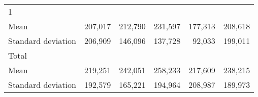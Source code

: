 \begin{tabular}{llllll}
\multicolumn{1}{l}{\hspace{3em}1} &
  \multicolumn{1}{|r}{} &
  \multicolumn{1}{r}{} &
  \multicolumn{1}{r}{} &
  \multicolumn{1}{r}{} &
  \multicolumn{1}{r}{} \\
\multicolumn{1}{l}{\hspace{4em}Mean} &
  \multicolumn{1}{|r}{207,017} &
  \multicolumn{1}{r}{212,790} &
  \multicolumn{1}{r}{231,597} &
  \multicolumn{1}{r}{177,313} &
  \multicolumn{1}{r}{208,618} \\
\multicolumn{1}{l}{\hspace{4em}Standard deviation} &
  \multicolumn{1}{|r}{206,909} &
  \multicolumn{1}{r}{146,096} &
  \multicolumn{1}{r}{137,728} &
  \multicolumn{1}{r}{92,033} &
  \multicolumn{1}{r}{199,011} \\
\multicolumn{1}{l}{\hspace{3em}Total} &
  \multicolumn{1}{|r}{} &
  \multicolumn{1}{r}{} &
  \multicolumn{1}{r}{} &
  \multicolumn{1}{r}{} &
  \multicolumn{1}{r}{} \\
\multicolumn{1}{l}{\hspace{4em}Mean} &
  \multicolumn{1}{|r}{219,251} &
  \multicolumn{1}{r}{242,051} &
  \multicolumn{1}{r}{258,233} &
  \multicolumn{1}{r}{217,609} &
  \multicolumn{1}{r}{238,215} \\
\multicolumn{1}{l}{\hspace{4em}Standard deviation} &
  \multicolumn{1}{|r}{192,579} &
  \multicolumn{1}{r}{165,221} &
  \multicolumn{1}{r}{194,964} &
  \multicolumn{1}{r}{208,987} &
  \multicolumn{1}{r}{189,973} \\
\cline{1-6}
\end{tabular}

